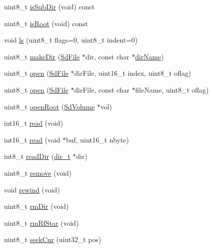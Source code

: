 \begin{DoxyCompactItemize}
\item 
uint8\+\_\+t \hyperlink{class_sd_file_a882e847b95aa47158d3df7ed7072d11e}{is\+Sub\+Dir} (void) const 
\item 
uint8\+\_\+t \hyperlink{class_sd_file_a0d0a535b287768e2ffa3b40c2e528ca4}{is\+Root} (void) const 
\item 
void \hyperlink{class_sd_file_afd9965ed8dee8bdd4d86dd14032edbc0}{ls} (uint8\+\_\+t flags=0, uint8\+\_\+t indent=0)
\item 
uint8\+\_\+t \hyperlink{class_sd_file_a62984bedf614a8de96b48bf9c5e7159f}{make\+Dir} (\hyperlink{class_sd_file}{Sd\+File} $\ast$dir, const char $\ast$\hyperlink{class_sd_file_ad7bbb106aa4c96c795c88b33def677bc}{dir\+Name})
\item 
uint8\+\_\+t \hyperlink{class_sd_file_a9e211ac14784f48aebb213194336f8cc}{open} (\hyperlink{class_sd_file}{Sd\+File} $\ast$dir\+File, uint16\+\_\+t index, uint8\+\_\+t oflag)
\item 
uint8\+\_\+t \hyperlink{class_sd_file_a3cf2167ad5ba6d84942ede8d2d07dcc6}{open} (\hyperlink{class_sd_file}{Sd\+File} $\ast$dir\+File, const char $\ast$file\+Name, uint8\+\_\+t oflag)
\item 
uint8\+\_\+t \hyperlink{class_sd_file_ac3612bc27eaf52a23d8cb85c8d96ad38}{open\+Root} (\hyperlink{class_sd_volume}{Sd\+Volume} $\ast$vol)
\item 
int16\+\_\+t \hyperlink{class_sd_file_a6c389f0180b4a86fb6d7464f50d3b0dd}{read} (void)
\item 
int16\+\_\+t \hyperlink{class_sd_file_a77ad85c5c80b34f8ebc57b5b89730554}{read} (void $\ast$buf, uint16\+\_\+t nbyte)
\item 
int8\+\_\+t \hyperlink{class_sd_file_ab240540b099cedcfe8b93b5e853d0628}{read\+Dir} (\hyperlink{_fat_structs_8h_a803db59d4e16a0c54a647afc6a7954e3}{dir\+\_\+t} $\ast$dir)
\item 
uint8\+\_\+t \hyperlink{class_sd_file_a66c5fb5f651a1ac319bab68fda1d3cc2}{remove} (void)
\item 
void \hyperlink{class_sd_file_afa8aaa7bdeb97b4e691ea01adf99f654}{rewind} (void)
\item 
uint8\+\_\+t \hyperlink{class_sd_file_a0d9e0c280b3469bb15e7258f6339746b}{rm\+Dir} (void)
\item 
uint8\+\_\+t \hyperlink{class_sd_file_a44c26fddfe2b42e7db3bc80290c77503}{rm\+Rf\+Star} (void)
\item 
uint8\+\_\+t \hyperlink{class_sd_file_aa95121ff038538e671f125160b280e9a}{seek\+Cur} (uint32\+\_\+t pos)
\item 

\end{DoxyCompactItemize}
